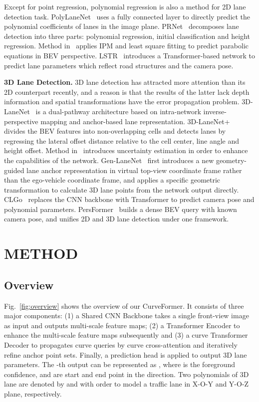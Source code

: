 \documentclass[letterpaper, 10 pt, conference]{ieeeconf}
\begin{document}
Except for point regression, polynomial regression is also a method for 2D lane detection task. PolyLaneNet~\cite{tabelini2020polylanenet} uses a fully connected layer to directly predict the polynomial coefficients of lanes in the image plane. PRNet~\cite{wang2020polynomial} decomposes lane detection into three parts: polynomial regression, initial classification and height regression. Method in~\cite{van2019end} applies IPM and least square fitting to predict parabolic equations in BEV perspective. LSTR~\cite{liu2021end} introduces a Transformer-based network to predict lane parameters which reflect road structures and the camera pose.

\noindent\textbf{3D Lane Detection.} 3D lane detection has attracted more attention than its 2D counterpart recently, and a reason is that the results of the latter lack depth information and spatial transformations have the error propagation problem. 3D-LaneNet~\cite{garnett20193d} is a dual-pathway architecture based on intra-network inverse-perspective mapping and anchor-based lane representation. 3D-LaneNet+~\cite{efrat20203d} divides the BEV features into non-overlapping cells and detects lanes by regressing the lateral offset distance relative to the cell center, line angle and height offset. Method in~\cite{efrat2020semi} introduces uncertainty estimation in order to enhance the capabilities of the network. Gen-LaneNet~\cite{guo2020gen} first introduces a new geometry-guided lane anchor representation in virtual top-view coordinate frame rather than the ego-vehicle coordinate frame, and applies a specific geometric transformation to calculate 3D lane points from the network output directly. CLGo~\cite{liu2022learning} replaces the CNN backbone with Transformer to predict camera pose and polynomial parameters. PersFormer~\cite{chen2022persformer} builds a dense BEV query with known camera pose, and unifies 2D and 3D lane detection under one framework.


\section{METHOD}


\subsection{Overview}
Fig.~\ref{fig:overview} shows the overview of our CurveFormer. It consists of three major components: (1) a Shared CNN Backbone takes a single front-view image as input and outputs multi-scale feature maps; (2) a Transformer Encoder to enhance the multi-scale feature maps subsequently and (3) a curve Transformer Decoder to propagates curve queries by curve cross-attention and iteratively refine anchor point sets. Finally, a prediction head is applied to output 3D lane parameters. The -th output can be represented as ,
where  is the foreground confidence,  and  are start and end point in the  direction. Two polynomials of 3D lane are denoted by  and  with order  to model a traffic lane in X-O-Y and Y-O-Z plane, respectively.
\end{document}
